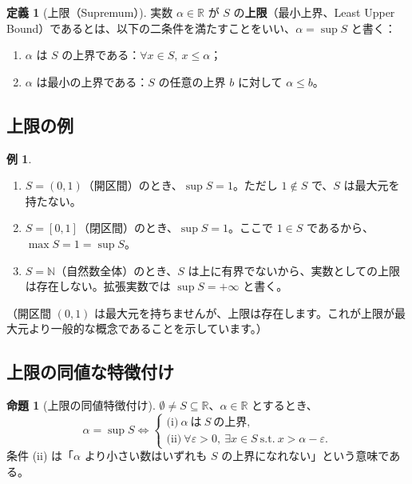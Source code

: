 \documentclass[11pt,a4paper]{jsarticle}
\theoremstyle{definition}
\newtheorem{definition}{定義}[section]
\newtheorem{proposition}{命題}[section]
\newtheorem{example}{例}[section]
\newcommand{\N}{\mathbb{N}}
\newcommand{\R}{\mathbb{R}}
\newcommand{\eps}{\varepsilon}
\newcommand{\kaisetsu}[1]{\textcolor{darkblue!70!black}{\small（#1）}}
\begin{document}
\begin{definitionbox}[定義：上限（最小上界）]
\begin{definition}[上限（Supremum）]\label{def:supremum}
実数 $\alpha \in \R$ が $S$ の\textbf{上限}（最小上界、Least Upper Bound）であるとは、以下の二条件を満たすことをいい、$\alpha = \sup S$ と書く：
\begin{enumerate}[label=(\roman*)]
\item $\alpha$ は $S$ の上界である：$\forall x \in S,\ x \leq \alpha$；
\item $\alpha$ は最小の上界である：$S$ の任意の上界 $b$ に対して $\alpha \leq b$。
\end{enumerate}
\end{definition}
\end{definitionbox}

\subsection{上限の例}

\begin{examplebox}[上限の具体例]
\begin{example}\label{ex:sup-examples}
\begin{enumerate}[label=(\arabic*)]
\item $S = (0, 1)$（開区間）のとき、$\sup S = 1$。ただし $1 \notin S$ で、$S$ は最大元を持たない。
\item $S = [0, 1]$（閉区間）のとき、$\sup S = 1$。ここで $1 \in S$ であるから、$\max S = 1 = \sup S$。
\item $S = \N$（自然数全体）のとき、$S$ は上に有界でないから、実数としての上限は存在しない。拡張実数では $\sup S = +\infty$ と書く。
\end{enumerate}
\end{example}
\kaisetsu{開区間 $(0,1)$ は最大元を持ちませんが、上限は存在します。これが上限が最大元より一般的な概念であることを示しています。}
\end{examplebox}

\subsection{上限の同値な特徴付け}

\begin{propbox}[命題：上限の同値な条件]
\begin{proposition}[上限の同値特徴付け]\label{prop:sup-equiv}
$\emptyset \neq S \subseteq \R$、$\alpha \in \R$ とするとき、
\[
\alpha = \sup S
\iff
\begin{cases}
\text{(i)}\ \alpha\ \text{は}\ S\ \text{の上界}, \\[0.3em]
\text{(ii)}\ \forall \eps > 0,\ \exists x \in S\ \text{s.t.}\ x > \alpha - \eps.
\end{cases}
\]
条件 (ii) は「$\alpha$ より小さい数はいずれも $S$ の上界になれない」という意味である。
\end{proposition}
\end{propbox}
\end{document}
